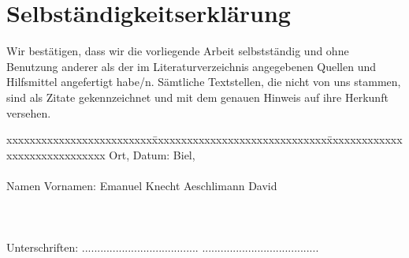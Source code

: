 \chapter*{Selbständigkeitserklärung}
\label{chap:selbstaendigkeitserklaerung}

\vspace*{10mm} 

Wir bestätigen, dass wir die vorliegende Arbeit selbstständig und ohne Benutzung anderer als der im Literaturverzeichnis angegebenen Quellen und Hilfsmittel angefertigt habe/n. Sämtliche Textstellen, die nicht von uns stammen, sind als Zitate gekennzeichnet und mit dem genauen Hinweis auf ihre Herkunft versehen. 

\vspace{15mm}

\begin{tabbing}
xxxxxxxxxxxxxxxxxxxxxxxxx\=xxxxxxxxxxxxxxxxxxxxxxxxxxxxxx\=xxxxxxxxxxxxxxxxxxxxxxxxxxxxxx\kill
Ort, Datum:		\> Biel, \versiondate \\ \\ 
Namen Vornamen:	\> Emanuel Knecht 	\> Aeschlimann David \\ \\ \\ \\ 
Unterschriften:	\> ......................................\> ...................................... \\
\end{tabbing}
